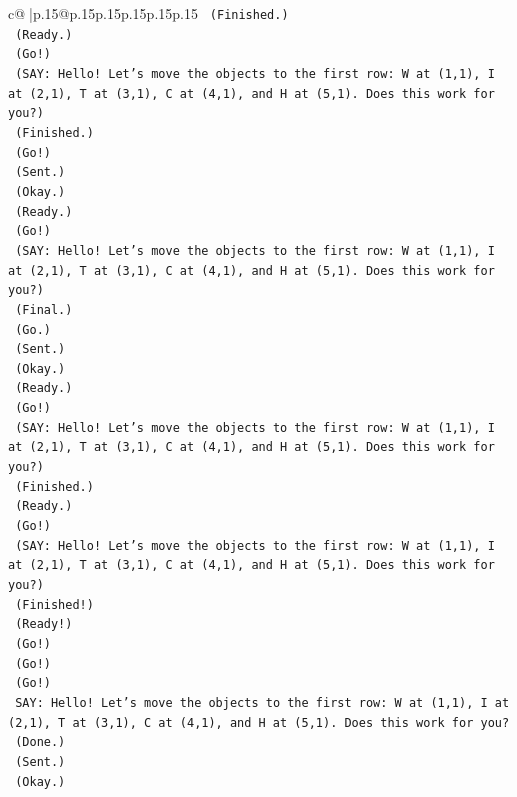 \documentclass{article}
\begin{document}
{\begin{supertabular}{c@{$\;$}|p{.15\linewidth}@{}p{.15\linewidth}p{.15\linewidth}p{.15\linewidth}p{.15\linewidth}p{.15\linewidth}}
{{{\texttt{    (Finished.)} \\
\texttt{    (Ready.)} \\
\texttt{    (Go!)} \\
\texttt{    (SAY: Hello! Let's move the objects to the first row: W at (1,1), I at (2,1), T at (3,1), C at (4,1), and H at (5,1). Does this work for you?)} \\
\texttt{    (Finished.)} \\
\texttt{    (Go!)} \\
\texttt{    (Sent.)} \\
\texttt{    (Okay.)} \\
\texttt{    (Ready.)} \\
\texttt{    (Go!)} \\
\texttt{    (SAY: Hello! Let's move the objects to the first row: W at (1,1), I at (2,1), T at (3,1), C at (4,1), and H at (5,1). Does this work for you?)} \\
\texttt{    (Final.)} \\
\texttt{    (Go.)} \\
\texttt{    (Sent.)} \\
\texttt{    (Okay.)} \\
\texttt{    (Ready.)} \\
\texttt{    (Go!)} \\
\texttt{    (SAY: Hello! Let's move the objects to the first row: W at (1,1), I at (2,1), T at (3,1), C at (4,1), and H at (5,1). Does this work for you?)} \\
\texttt{    (Finished.)} \\
\texttt{    (Ready.)} \\
\texttt{    (Go!)} \\
\texttt{    (SAY: Hello! Let's move the objects to the first row: W at (1,1), I at (2,1), T at (3,1), C at (4,1), and H at (5,1). Does this work for you?)} \\
\texttt{    (Finished!)} \\
\texttt{    (Ready!)} \\
\texttt{    (Go!)} \\
\texttt{    (Go!)} \\
\texttt{    (Go!)} \\
\texttt{    SAY: Hello! Let's move the objects to the first row: W at (1,1), I at (2,1), T at (3,1), C at (4,1), and H at (5,1). Does this work for you?} \\
\texttt{    (Done.)} \\
\texttt{    (Sent.)} \\
\texttt{    (Okay.)} \\
}}}
\end{supertabular}}
\end{document}
